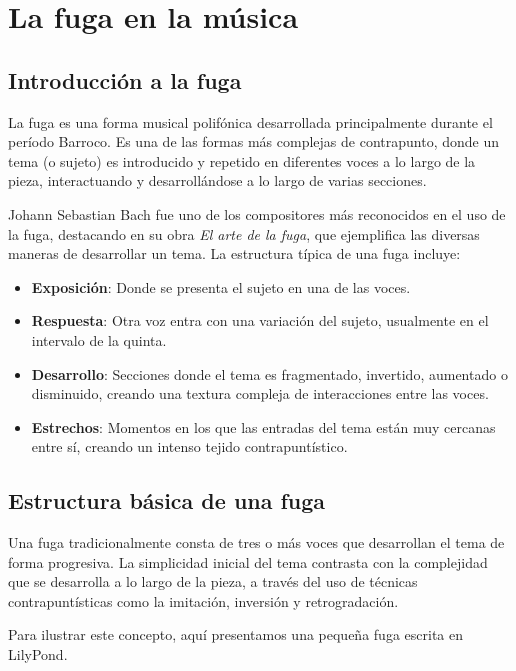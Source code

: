 \chapter{La fuga en la música}

\section{Introducción a la fuga}

La fuga es una forma musical polifónica desarrollada principalmente durante el período Barroco. Es una de las formas más complejas de contrapunto, donde un tema (o sujeto) es introducido y repetido en diferentes voces a lo largo de la pieza, interactuando y desarrollándose a lo largo de varias secciones.

Johann Sebastian Bach fue uno de los compositores más reconocidos en el uso de la fuga, destacando en su obra \emph{El arte de la fuga}, que ejemplifica las diversas maneras de desarrollar un tema. La estructura típica de una fuga incluye:

\begin{itemize}
	\item \textbf{Exposición}: Donde se presenta el sujeto en una de las voces.
	\item \textbf{Respuesta}: Otra voz entra con una variación del sujeto, usualmente en el intervalo de la quinta.
	\item \textbf{Desarrollo}: Secciones donde el tema es fragmentado, invertido, aumentado o disminuido, creando una textura compleja de interacciones entre las voces.
	\item \textbf{Estrechos}: Momentos en los que las entradas del tema están muy cercanas entre sí, creando un intenso tejido contrapuntístico.
\end{itemize}

\section{Estructura básica de una fuga}

Una fuga tradicionalmente consta de tres o más voces que desarrollan el tema de forma progresiva. La simplicidad inicial del tema contrasta con la complejidad que se desarrolla a lo largo de la pieza, a través del uso de técnicas contrapuntísticas como la imitación, inversión y retrogradación.

Para ilustrar este concepto, aquí presentamos una pequeña fuga escrita en LilyPond.

